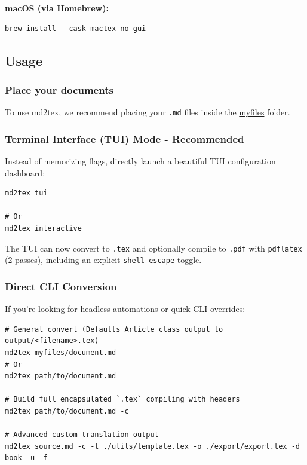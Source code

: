\documentclass[a4paper, 12pt, twoside]{article}
\begin{document}
\noindent{}\textbf{macOS (via Homebrew):}

\begin{lstlisting}
brew install --cask mactex-no-gui
\end{lstlisting}

\subsection*{Usage}

\subsubsection*{Place your documents}

To use md2tex, we recommend placing your \texttt{.md} files inside the \href{/myfiles/}{myfiles} folder.

\subsubsection*{Terminal Interface (TUI) Mode - Recommended}

Instead of memorizing flags, directly launch a beautiful TUI configuration dashboard:

\begin{lstlisting}
md2tex tui

# Or
md2tex interactive
\end{lstlisting}

The TUI can now convert to \texttt{.tex} and optionally compile to \texttt{.pdf} with \texttt{pdflatex} (2 passes), including an explicit \texttt{shell-escape} toggle.

\subsubsection*{Direct CLI Conversion}

If you're looking for headless automations or quick CLI overrides:

\begin{lstlisting}
# General convert (Defaults Article class output to output/<filename>.tex)
md2tex myfiles/document.md
# Or
md2tex path/to/document.md

# Build full encapsulated `.tex` compiling with headers
md2tex path/to/document.md -c

# Advanced custom translation output
md2tex source.md -c -t ./utils/template.tex -o ./export/export.tex -d book -u -f
\end{lstlisting}
\end{document}
